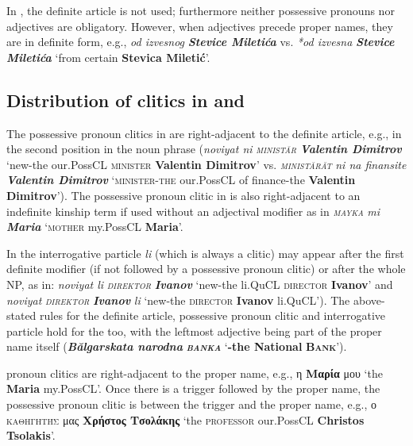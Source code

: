 \documentclass[output=paper]{langsci/langscibook}
\newcommand{\trigger}[1]{\textsc{#1}}
\begin{document}
{In , the definite article is not used; furthermore neither
possessive pronouns nor adjectives are obligatory. However, when
adjectives precede proper names, they are in definite form, e.g.,
\textit{od izvesnog }\textbf{\textit{Stevice Miletića}} vs. \textit{*od
izvesna }\textbf{\textit{Stevice Miletića}} ‘from certain
\textbf{Stevica Miletić}’.


\subsection{Distribution of clitics in  and } %

The possessive pronoun clitics in  are right-adjacent to the
definite article, e.g., in the second position in the noun phrase
(\textit{noviyat ni }\textit{\trigger{ministăr}} \textbf{\textit{Valentin
Dimitrov}} ‘new-the our.PossCL \trigger{minister} \textbf{Valentin
Dimitrov}’ vs. \textit{\trigger{ministărăt}} \textit{ni na finansite
}\textbf{\textit{Valentin Dimitrov}} ‘\trigger{minister-the} our.PossCL
of finance-the \textbf{Valentin Dimitrov}’). The possessive pronoun
clitic in  is also right-adjacent to an indefinite kinship
term if used without an adjectival modifier as in
\textit{\trigger{mayka}} \textit{mi} \textbf{\textit{Maria}}
‘\trigger{mother} my.PossCL \textbf{Maria}’.



In  the interrogative particle \textit{li} (which is always a
clitic) may appear after the first definite modifier (if not followed
by a possessive pronoun clitic) or after the whole NP, as in:
\textit{noviyat li }\textit{\trigger{direktor}} \textbf{\textit{Ivanov}}
‘new-the li.QuCL \trigger{d}\trigger{irector}\textbf{ Ivanov}’ and
\textit{noviyat }\textit{\trigger{direktor}}\textit{
}\textbf{\textit{Ivanov}}\textit{ li} `new-the
\trigger{d}\trigger{ir}\trigger{ector} \textbf{Ivanov} li.QuCL'). The
above-stated rules for the definite article, possessive pronoun clitic
and interrogative particle hold for the  too, with the
leftmost adjective being part of the proper name itself
(\textbf{\textit{Bălgarskata narodna }}\textbf{\textit{\trigger{banka}}}
‘\textbf{-the National }\textbf{\trigger{Bank}}’).



 pronoun clitics are right-adjacent to the proper name, e.g.,
η \textbf{Μαρία} μου ‘the \textbf{Maria
}my.PossCL’. Once there is a trigger followed by the proper name, the
possessive pronoun clitic is between the trigger and the proper name,
e.g., ο \trigger{καθηγητής} μας
\textbf{Χρήστος Τσολάκης} ‘the \trigger{professor} our.PossCL
\textbf{Christos Tsolakis}’.



}
\end{document}
